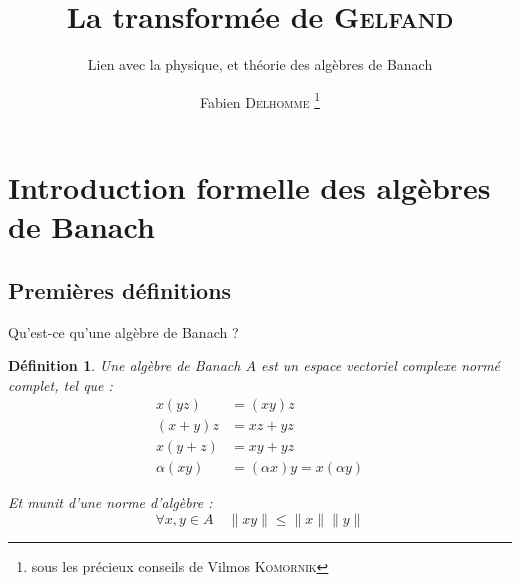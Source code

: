 \documentclass[11pt, xcolor=table]{beamer}
\title{La transformée de \textsc{Gelfand}}
\subtitle{Lien avec la physique, et théorie des algèbres de Banach}
\author{Fabien \textsc{Delhomme} \thanks{sous les précieux conseils de Vilmos \textsc{Komornik}}}
\begin{document}
\newcommand{\Bh}{$\mathcal{B}(H)$ }
\newcommand{\Bhm}{\mathcal{B}(H)}
\newcommand{\Z}[1]{\mathbb{Z}/#1\mathbb{Z}}
\newcommand{\Ze}{\mathbb{Z}}
\newcommand{\N}{\mathrm{N}}
\newcommand{\C}{\mathbb{C}}
\newcommand{\R}{\mathbb{R}}
\newcommand{\Lun}{\mathrm{L}^1}
\newcommand{\Ker}{\mathrm{Ker}}
\newcommand{\e}{\textrm{e}}
\newcommand{\inv}[1]{#1^\ast}
\newcommand{\norminf}[1]{\| #1 \|_{\infty}}
\newcommand{\Calg}{$\mathcal{C}^\ast$-algèbre }
\newcommand{\Calgs}{$\mathcal{C}^\ast$-algèbres }

\newtheorem{myth}{Theorème}
\newtheorem{mydef}{Définition}
\newtheorem{cor}{Corollaire}
\newtheorem{ex}{Exemple}

\maketitle

\section{Introduction formelle des algèbres de Banach}


\subsection{Premières définitions}

\begin{frame}{Qu'est-ce qu'une algèbre de Banach ?}
    \begin{mydef}
        Une algèbre de Banach $A$ est un espace vectoriel complexe normé \emph{complet}, tel que :
        \begin{align*}
            x(yz) &= (xy)z\\
            (x + y)z &= xz + yz\\
            x(y+z) &= xy + yz \\
            \alpha(xy) &= (\alpha x)y = x(\alpha y)
        \end{align*}
       
        Et munit d'une norme d'algèbre :
        \begin{displaymath}
            \forall x,y \in A \quad \| x y \| \leq \|x\| \|y\|
        \end{displaymath}
    \end{mydef}
\end{frame}
\end{document}
